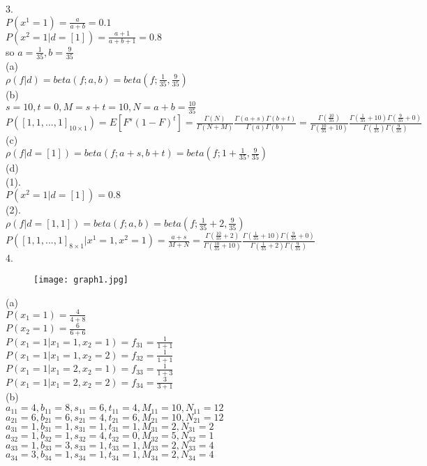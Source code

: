 \documentclass[a4paper]{article}
\begin{document}
3. \\
$P(x^1=1)=\frac{a}{a+b}=0.1$\\
$P(x^2=1|d=[1])=\frac{a+1}{a+b+1}=0.8$\\
so $a=\frac{1}{35},b=\frac{9}{35}$\\
(a)\\
$\rho(f|d)=beta(f; a, b)=beta(f;\frac{1}{35},\frac{9}{35})$\\
(b)\\
$s = 10, t = 0, M = s + t = 10, N = a + b = \frac{10}{35}$\\
$P([1,1,...,1]_{10 \times 1})=E[F^s(1-F)^t]=\frac{\Gamma(N)}{\Gamma(N + M)} \frac{\Gamma(a+s)\Gamma(b+t)}{\Gamma(a)\Gamma(b)}
	=\frac{\Gamma(\frac{10}{35})}{\Gamma(\frac{10}{35} + 10)} \frac{\Gamma(\frac{1}{35}+10)\Gamma(\frac{9}{35}+0)}{\Gamma(\frac{1}{35})\Gamma(\frac{9}{35})}$\\
(c)\\
$\rho(f|d=[1])=beta(f; a+s, b+t)=beta(f;1+\frac{1}{35},\frac{9}{35})$\\
(d)\\
(1). \\
$P(x^2=1|d=[1])=0.8$\\
(2). \\
$\rho(f|d=[1,1])=beta(f; a, b)=beta(f;\frac{1}{35}+2,\frac{9}{35})$\\
$P([1,1,...,1]_{8 \times 1}|x^1=1,x^2=1)=\frac{a+s}{M+N}=\frac{\Gamma(\frac{10}{35}+2)}{\Gamma(\frac{10}{35} + 10)} \frac{\Gamma(\frac{1}{35}+10)\Gamma(\frac{9}{35}+0)}{\Gamma(\frac{1}{35}+2)\Gamma(\frac{9}{35})}$\\

4. \\
\begin{figure}[htbp]
\centering
\texttt{[image: graph1.jpg]}
\end{figure}
(a)\\
$P(x_1=1)=\frac{4}{4+8}$\\
$P(x_2=1)=\frac{6}{6+6}$\\
$P(x_1=1|x_1=1,x_2=1)=f_{31}=\frac{1}{1+1}$\\
$P(x_1=1|x_1=1,x_2=2)=f_{32}=\frac{1}{1+1}$\\
$P(x_1=1|x_1=2,x_2=1)=f_{33}=\frac{1}{1+3}$\\
$P(x_1=1|x_1=2,x_2=2)=f_{34}=\frac{3}{3+1}$\\

(b)\\
$a_{11}=4, b_{11}=8, s_{11}=6, t_{11}=4, M_{11}=10, N_{11}=12$\\
$a_{21}=6, b_{21}=6, s_{21}=4, t_{21}=6, M_{21}=10, N_{21}=12$\\
$a_{31}=1, b_{31}=1, s_{31}=1, t_{31}=1, M_{31}=2, N_{31}=2$\\
$a_{32}=1, b_{32}=1, s_{32}=4, t_{32}=0, M_{32}=5, N_{32}=1$\\
$a_{33}=1, b_{33}=3, s_{33}=1, t_{33}=1, M_{33}=2, N_{33}=4$\\
$a_{34}=3, b_{34}=1, s_{34}=1, t_{34}=1, M_{34}=2, N_{34}=4$\\
\end{document}
